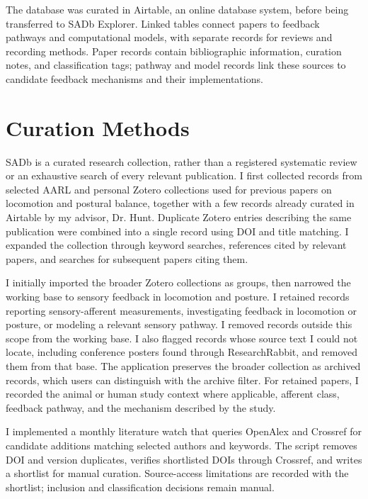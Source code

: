 The database was curated in Airtable, an online database system, before being transferred to SADb Explorer. Linked tables connect papers to feedback pathways and computational models, with separate records for reviews and recording methods. Paper records contain bibliographic information, curation notes, and classification tags; pathway and model records link these sources to candidate feedback mechanisms and their implementations.

\section{Curation Methods}\label{sec:sadb_methods}

SADb is a curated research collection, rather than a registered systematic review or an exhaustive search of every relevant publication. I first collected records from selected AARL and personal Zotero collections used for previous papers on locomotion and postural balance, together with a few records already curated in Airtable by my advisor, Dr. Hunt. Duplicate Zotero entries describing the same publication were combined into a single record using DOI and title matching. I expanded the collection through keyword searches, references cited by relevant papers, and searches for subsequent papers citing them.

I initially imported the broader Zotero collections as groups, then narrowed the working base to sensory feedback in locomotion and posture. I retained records reporting sensory-afferent measurements, investigating feedback in locomotion or posture, or modeling a relevant sensory pathway. I removed records outside this scope from the working base. I also flagged records whose source text I could not locate, including conference posters found through ResearchRabbit, and removed them from that base. The application preserves the broader collection as archived records, which users can distinguish with the archive filter. For retained papers, I recorded the animal or human study context where applicable, afferent class, feedback pathway, and the mechanism described by the study.

I implemented a monthly literature watch that queries OpenAlex and Crossref for candidate additions matching selected authors and keywords. The script removes DOI and version duplicates, verifies shortlisted DOIs through Crossref, and writes a shortlist for manual curation. Source-access limitations are recorded with the shortlist; inclusion and classification decisions remain manual.


